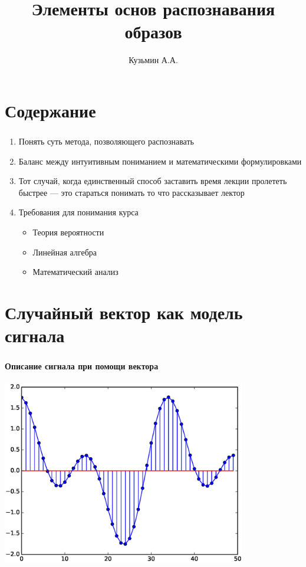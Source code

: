 \documentclass{beamer}
\title{Элементы основ распознавания образов}
\author{Кузьмин А.А.}
\institute[]{\url{http://rfe.bsu.by/}}
\begin{document}
\begin{frame}
  \maketitle
\end{frame}

\section{Содержание}

\begin{frame} \label{cont}
  \frametitle{\insertsection}

  \begin{enumerate}
    \item Понять суть метода, позволяющего распознавать \pause
  \item Баланс между интуитивным пониманием и математическими формулировками \pause
  \item Тот случай, когда единственный способ заставить время лекции пролететь быстрее --- это стараться понимать то что рассказывает лектор \pause
  \item Требования для понимания курса \pause
    \begin{itemize}
      \item Теория вероятности
      \item Линейная алгебра
      \item Математический анализ
    \end{itemize}
  \end{enumerate}
\end{frame}

\section{Случайный вектор как модель сигнала}

\begin{frame}
  \frametitle{\insertsection}
  \framesubtitle{Описание сигнала при помощи вектора}
  \includegraphics[width=0.8\textwidth]{tovec.eps}
\end{frame}
\end{document}
